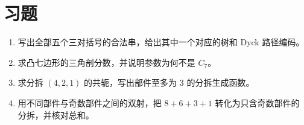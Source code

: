 \section{习题}
\begin{enumerate}
  \item\label{ex:classical-structures-1} 写出全部五个三对括号的合法串，给出其中一个对应的树和 Dyck 路径编码。
  \item\label{ex:classical-structures-2} 求凸七边形的三角剖分数，并说明参数为何不是 $C_7$。
  \item\label{ex:classical-structures-3} 求分拆 $(4,2,1)$ 的共轭，写出部件至多为 $3$ 的分拆生成函数。
  \item\label{ex:classical-structures-4} 用不同部件与奇数部件之间的双射，把 $8+6+3+1$ 转化为只含奇数部件的分拆，并核对总和。
\end{enumerate}

